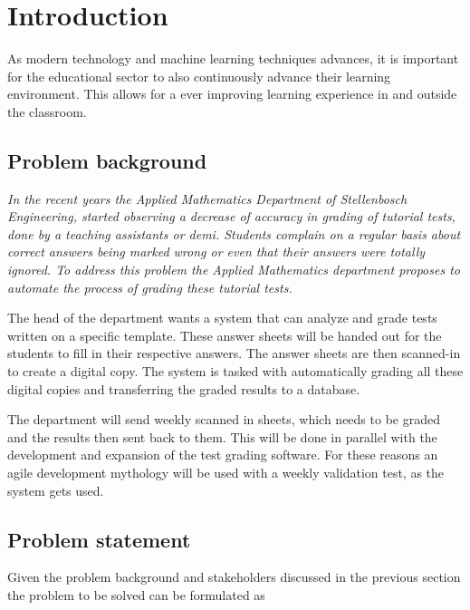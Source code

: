 \chapter{Introduction}
\label{ch:Introduction}
\graphicspath{{Chapter1/Chapter1Figures/}}

As modern technology and machine learning techniques advances, it is important for the educational sector to also continuously advance their learning environment. This allows for a ever improving learning experience in and outside the classroom. 

\section{Problem background}

\textsl{In the recent years the Applied Mathematics Department of Stellenbosch Engineering, started observing a decrease of accuracy in grading of tutorial tests, done by a teaching assistants or demi. Students complain on a regular basis about correct answers being marked wrong or even that their answers were totally ignored. To address this problem the Applied Mathematics department proposes to automate the process of grading these tutorial tests.}

The head of the department wants a system that can analyze and grade tests written on a specific template. These answer sheets will be handed out for the students to fill in their respective answers. The answer sheets are then scanned-in to create a digital copy. The system is tasked with automatically grading all these digital copies and transferring the graded results to a database.

The department will send weekly scanned in sheets, which needs to be graded and the results then sent back to them. This will be done in parallel with the development and expansion of the test grading software. For these reasons an agile development mythology will be used with a weekly validation test, as the system gets used. 

\section{Problem statement}
\label{problemStatement}
Given the problem background and stakeholders discussed in the previous section the problem to be solved can be formulated as

\noindent{}

